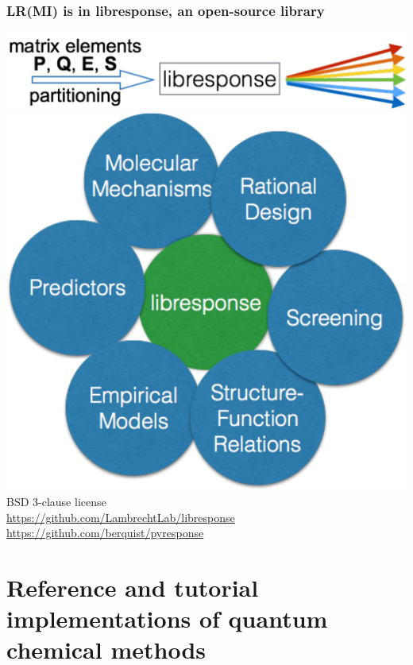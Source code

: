 \documentclass[%
    xcolor=usenames,dvipsnames,svgnames%
]{beamer}
\newenvironment{nscenter}
 {\parskip=0pt\par\nopagebreak\centering}
 {\par\noindent\ignorespacesafterend}
\begin{document}
\begin{frame}
  \frametitle{LR(MI) is in libresponse, an open-source library}
  \scriptsize
  \begin{nscenter}
    \includegraphics[scale=0.30]{./figures/libresponse_top.pdf} \\
    \includegraphics[scale=0.32]{./figures/libresponse_bottom.pdf} \\
    BSD 3-clause license \\
    \url{https://github.com/LambrechtLab/libresponse} \\
    \url{https://github.com/berquist/pyresponse}
  \end{nscenter}
\end{frame}

\section{Reference and tutorial implementations of quantum chemical methods}
\end{document}
